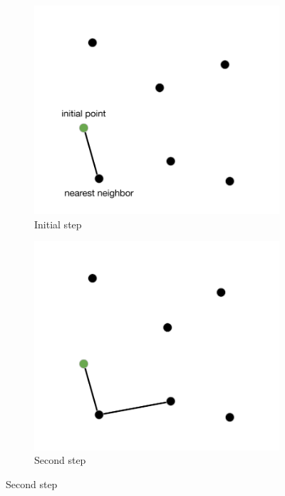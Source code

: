 \begin{figure}[h!]
  \centering
  \begin{subfigure}[b]{0.49\linewidth}
    \includegraphics[width=\linewidth]{media/fase1.pdf}
     \caption{Initial step}
  \end{subfigure}
  \begin{subfigure}[b]{0.49\linewidth}
    \includegraphics[width=\linewidth]{media/fase2.pdf}
    \caption{Second step}
  \end{subfigure}

\end{figure}
